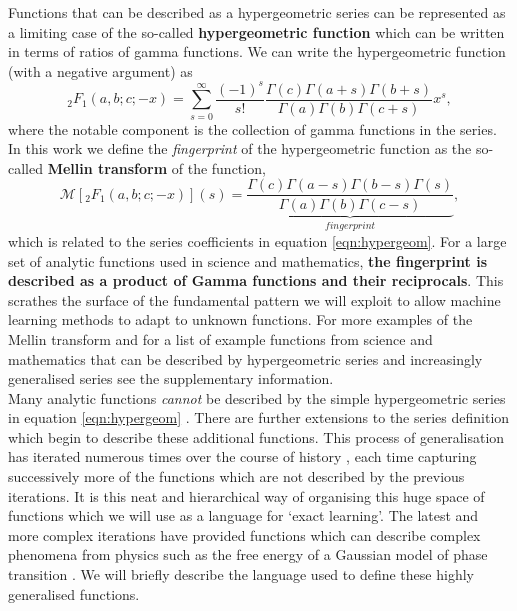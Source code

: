 \documentclass{article}
\begin{document}
Functions that can be described as a hypergeometric series can be represented as a limiting case of the so-called \textbf{hypergeometric function} which can be written in terms of ratios of gamma functions. We can write the hypergeometric function (with a negative argument) as
\begin{equation}
_2F_1(a,b;c;-x) = \sum_{s=0}^\infty \frac{(-1)^s}{s!} \frac{\Gamma(c)\Gamma(a+s)\Gamma(b+s)}{\Gamma(a)\Gamma(b)\Gamma(c+s)} x^s,
\label{eqn:hypergeom}
\end{equation}
where the notable component is the collection of gamma functions in the series. In this work we define the \emph{fingerprint} of the hypergeometric function as the so-called \textbf{Mellin transform} \cite{Fikioris2006} of the function, 
\begin{equation}
\mathcal{M}\left[_2F_1(a,b;c;-x)\right](s) = \underbrace{\frac{\Gamma(c)\Gamma(a-s)\Gamma(b-s)\Gamma(s)}{\Gamma(a)\Gamma(b)\Gamma(c-s)}}_{fingerprint},
\end{equation}
which is related to the series coefficients in equation \ref{eqn:hypergeom}. For a large set of analytic functions used in science and mathematics, \textbf{the fingerprint is described as a product of Gamma functions and their reciprocals}. This scrathes the surface of the fundamental pattern we will exploit to allow machine learning methods to adapt to unknown functions. For more examples of the Mellin transform and for a list of example functions from science and mathematics that can be described by hypergeometric series and increasingly generalised series see the supplementary information. \\

Many analytic functions \emph{cannot} be described by the simple hypergeometric series in equation \ref{eqn:hypergeom} \cite{Rathie1997}. There are further extensions to the series definition which begin to describe these additional functions. This process of generalisation has iterated numerous times over the course of history \cite{Wright1935,Fox1961,Inayat-Hussain1987,Rathie1997}, each time capturing successively more of the functions which are not described by the previous iterations. It is this neat and hierarchical way of organising this huge space of functions which we will use as a language for `exact learning'. The latest and more complex iterations have provided functions which can describe complex phenomena from physics such as the free energy of a Gaussian model of phase transition \cite{Rathie1997}. We will briefly describe the language used to define these highly generalised functions.\\
\end{document}
